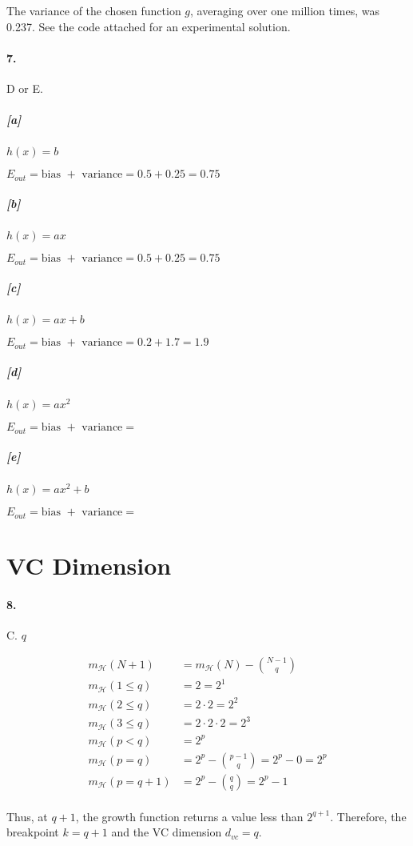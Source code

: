 \documentclass[10pt,letter]{article}
\begin{document}
	The variance of the chosen function $g$, averaging over one million times, was 0.237. See the code attached for an experimental solution.

\paragraph{7.} D or E.

	\subparagraph{[a]} $h(x) = b$

		$E_{out} = \text{bias } + \text{ variance} = 0.5 + 0.25 = 0.75$
	\subparagraph{[b]} $h(x) = ax$

		$E_{out} = \text{bias } + \text{ variance} = 0.5 + 0.25 = 0.75$
	\subparagraph{[c]} $h(x) = ax+b$

		$E_{out} = \text{bias } + \text{ variance} = 0.2 + 1.7 = 1.9$
	\subparagraph{[d]} $h(x) = ax^2$

		$E_{out} = \text{bias } + \text{ variance} = $
	\subparagraph{[e]} $h(x) = ax^2+b$

		$E_{out} = \text{bias } + \text{ variance} =$

\section*{VC Dimension}

\paragraph{8.} C. $q$

	\begin{align*}
	m_\mathcal{H}(N+1) &= m_\mathcal{H}(N) - \binom{N-1}{q} \\
	m_\mathcal{H}(1 \leq q) &= 2 = 2^1 \\
	m_\mathcal{H}(2 \leq q) &= 2\cdot2 = 2^2 \\
	m_\mathcal{H}(3 \leq q) &= 2\cdot2\cdot2 = 2^3 \\
	m_\mathcal{H}(p < q) &= 2^p \\
	m_\mathcal{H}(p = q) &= 2^p - \binom{p-1}{q} = 2^p - 0 = 2^p \\
	m_\mathcal{H}(p = q+1) &= 2^p - \binom{q}{q} = 2^p - 1 \\
	\end{align*}

	Thus, at $q+1$, the growth function returns a value less than $2^{q+1}$. Therefore, the breakpoint $k=q+1$ and the VC dimension $d_{vc} = q $.
\end{document}
